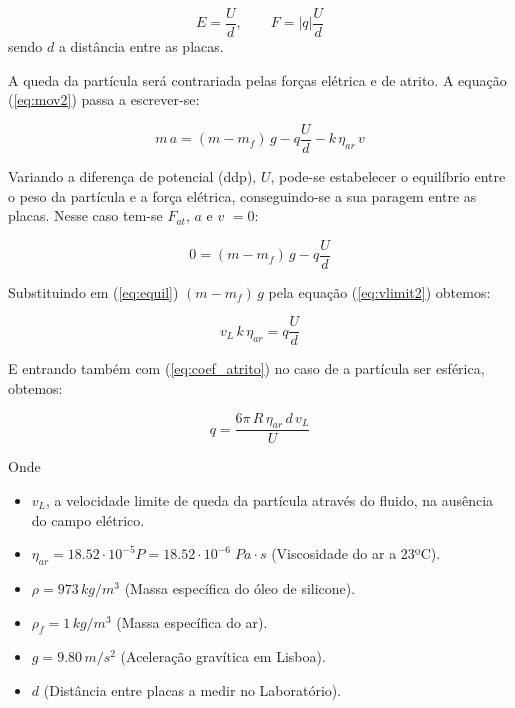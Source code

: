 \documentclass[a4paper,twoside,12pt]{article}      %
\begin{document}
\begin{equation*}
	E = \frac{U}{d}, \qquad  F = |q| \frac{U}{d}
\end{equation*}
sendo $d$ a distância entre as placas. 


A queda da partícula será  contrariada pelas forças elétrica  e de atrito.
A equação (\ref{eq:mov2}) passa a escrever-se:

\begin{equation}
	\label{eq:mov3}
	m\,a = (m - m_f)\,g  - q \frac{U}{d} - k  \, \eta_{ar} \, v
\end{equation}

Variando a diferença de potencial (ddp), $U$, pode-se estabelecer o equilíbrio entre o peso da partícula e a força elétrica, conseguindo-se a sua paragem entre as placas. Nesse caso tem-se $F_{at}$, $a$ e  $v$  $=0$:

\begin{equation}
	\label{eq:equil}
	0 = (m - m_f)\,g  - q \frac{U}{d} 
\end{equation}

Substituindo em (\ref{eq:equil}) $(m - m_f)\,g$   pela equação (\ref{eq:vlimit2}) obtemos:

\begin{equation*}
	v_L\, k\, \eta_{ar} = q \frac{U}{d}
\end{equation*}

E entrando também com (\ref{eq:coef_atrito}) no caso de a partícula ser esférica, obtemos:

\begin{equation}
	\label{eq:carga}
	q = \frac{6 \pi \, R \, \eta_{ar} \, d\, v_L}{U}  
\end{equation}

Onde

\begin{itemize}
\item $v_L$, a velocidade limite de queda da partícula através do fluido, na ausência do campo elétrico. 
\item $\eta_{ar} = 18.52 \cdot 10^{-5} P =  18.52 \cdot 10^{-6} \; Pa\cdot s $ (Viscosidade do ar a 23ºC).
\item $\rho = 973 \, kg/m^{3}$ (Massa específica do óleo de silicone).
\item $\rho_f = 1 \, kg/m^{3}$ (Massa específica do ar).
\item $g=9.80\, m/s^{2}$ (Aceleração gravítica em Lisboa).
\item $d$ (Distância entre placas a medir no Laboratório).
\end{itemize}
\end{document}
